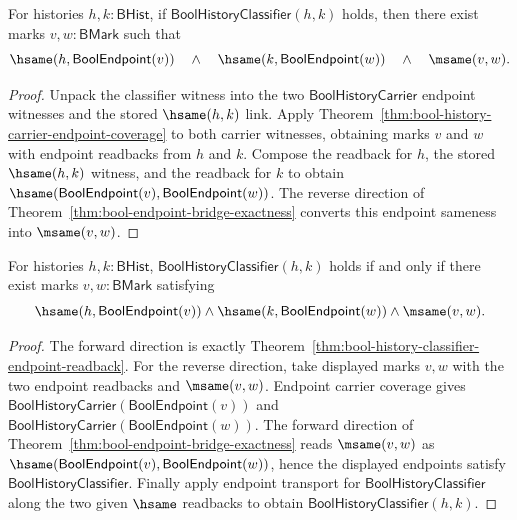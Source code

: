 \begin{theorem}
\label{thm:bool-history-classifier-endpoint-readback}
For histories $h,k:\mathsf{BHist}$, if
$\mathsf{BoolHistoryClassifier}(h,k)$ holds, then there exist marks
$v,w:\mathsf{BMark}$ such that
$$
  \hsame(h,\mathsf{BoolEndpoint}(v))
  \quad\land\quad
  \hsame(k,\mathsf{BoolEndpoint}(w))
  \quad\land\quad
  \msame(v,w).
$$
\end{theorem}
\begin{proof}
Unpack the classifier witness into the two $\mathsf{BoolHistoryCarrier}$
endpoint witnesses and the stored $\hsame(h,k)$ link. Apply
Theorem~\ref{thm:bool-history-carrier-endpoint-coverage} to both carrier
witnesses, obtaining marks $v$ and $w$ with endpoint readbacks from $h$ and
$k$. Compose the readback for $h$, the stored $\hsame(h,k)$ witness, and the
readback for $k$ to obtain
$\hsame(\mathsf{BoolEndpoint}(v),\mathsf{BoolEndpoint}(w))$. The reverse
direction of Theorem~\ref{thm:bool-endpoint-bridge-exactness} converts this
endpoint sameness into $\msame(v,w)$.
\end{proof}

\begin{theorem}
\label{thm:bool-history-classifier-mark-readback-exactness}
For histories $h,k:\mathsf{BHist}$,
$\mathsf{BoolHistoryClassifier}(h,k)$ holds if and only if there exist marks
$v,w:\mathsf{BMark}$ satisfying
$$
  \hsame(h,\mathsf{BoolEndpoint}(v))
  \land
  \hsame(k,\mathsf{BoolEndpoint}(w))
  \land
  \msame(v,w).
$$
\end{theorem}
\begin{proof}
The forward direction is exactly
Theorem~\ref{thm:bool-history-classifier-endpoint-readback}. For the reverse
direction, take displayed marks $v,w$ with the two endpoint readbacks and
$\msame(v,w)$. Endpoint carrier coverage gives
$\mathsf{BoolHistoryCarrier}(\mathsf{BoolEndpoint}(v))$ and
$\mathsf{BoolHistoryCarrier}(\mathsf{BoolEndpoint}(w))$. The forward direction
of Theorem~\ref{thm:bool-endpoint-bridge-exactness} reads $\msame(v,w)$ as
$\hsame(\mathsf{BoolEndpoint}(v),\mathsf{BoolEndpoint}(w))$, hence the displayed
endpoints satisfy $\mathsf{BoolHistoryClassifier}$. Finally apply endpoint
transport for $\mathsf{BoolHistoryClassifier}$ along the two given $\hsame$
readbacks to obtain $\mathsf{BoolHistoryClassifier}(h,k)$.
\end{proof}

